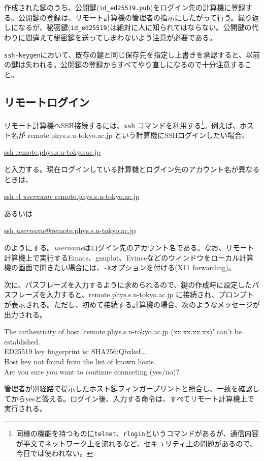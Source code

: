 作成された鍵のうち、公開鍵(\texttt{id\_ed25519.pub})をログイン先の計算機に登録する。公開鍵の登録は、リモート計算機の管理者の指示にしたがって行う。繰り返しになるが、秘密鍵(\texttt{id\_ed25519})は絶対に人に知られてはならない。公開鍵の代わりに間違えて秘密鍵を送ってしまわないよう注意が必要である。

\texttt{ssh-keygen}において、既存の鍵と同じ保存先を指定し上書きを承認すると、以前の鍵は失われる。公開鍵の登録からすべてやり直しになるので十分注意すること。

\subsection{リモートログイン}

リモート計算機へSSH接続するには、\texttt{ssh} コマンドを利用する\footnote{同様の機能を持つものに\texttt{telnet}、\texttt{rlogin}というコマンドがあるが、通信内容が平文でネットワーク上を流れるなど、セキュリティ上の問題があるので、今日では使われない。}。例えば、ホスト名が remote.phys.s.u-tokyo.ac.jp という計算機にSSHログインしたい場合、
\begin{commandline2}
    \prompt \underline{ssh remote.phys.s.u-tokyo.ac.jp}
\end{commandline2} \noindent
と入力する。現在ログインしている計算機とログイン先のアカウント名が異なるときは、
\begin{commandline2}
    \prompt \underline{ssh  -l \textit{username} remote.phys.s.u-tokyo.ac.jp}
\end{commandline2} \noindent
あるいは
\begin{commandline2}
    \prompt \underline{ssh \textit{username}@remote.phys.s.u-tokyo.ac.jp}
\end{commandline2} \noindent
のようにする。\textit{username}はログイン先のアカウント名である。なお、リモート計算機上で実行するEmacs、gnuplot、Evinceなどのウィンドウをローカル計算機の画面で開きたい場合には、\texttt{-X}オプションを付ける(X11 forwarding)。

次に、パスフレーズを入力するように求められるので、鍵の作成時に設定したパスフレーズを入力すると、remote.phys.s.u-tokyo.ac.jp に接続され、プロンプトが表示される。ただし、初めて接続する計算機の場合、次のようなメッセージが出力される。
\begin{commandline2}
    The authenticity of host 'remote.phys.s.u-tokyo.ac.jp (xx.xx.xx.xx)' can't be established.\\
    ED25519 key fingerprint is: SHA256:Qbxkef...\\
    Host key not found from the list of known hosts.\\
    Are you sure you want to continue connecting (yes/no)?
\end{commandline2} \noindent
管理者が別経路で提示したホスト鍵フィンガープリントと照合し、一致を確認してからyesと答える。ログイン後、入力する命令は、すべてリモート計算機上で実行される。

